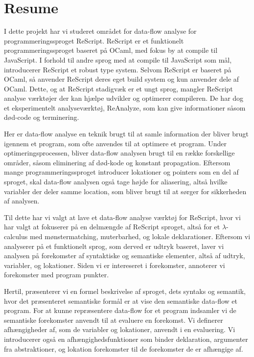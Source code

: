 \documentclass[../master.tex]{subfiles}
\begin{document}
\section*{Resume}
I dette projekt har vi studeret området for data-flow analyse for programmeringssproget ReScript.
ReScript er et funktionelt programmeringssproget baseret på OCaml, med fokus by at compile til JavaScript.
I forhold til andre sprog med at compile til JavaScript som mål, introducerer ReScript et robust type system.
Selvom ReScript er baseret på OCaml, så anvender ReScript deres eget build system og kun anvender dele af OCaml.
Dette, og at ReScript stadigvæk er et ungt sprog, mangler ReScript analyse værktøjer der kan hjælpe udvikler og optimerer compileren.
De har dog et eksperimentelt analyseværktøj, ReAnalyze, som kan give informationer såsom død-code og terminering.

Her er data-flow analyse en teknik brugt til at samle information der bliver brugt igennem et program, som ofte anvendes til at optimere et program.
Under optimeringsprocessen, bliver data-flow analysen brugt til en række forskellige områder, såsom eliminering af død-kode og konstant propagation.
Eftersom mange programmeringssproget introducer lokationer og pointers som en del af sproget, skal data-flow analysen også tage højde for aliasering, altså hvilke variabler der deler samme location, som bliver brugt til at sørger for sikkerheden af analysen.
\bigskip

Til dette har vi valgt at lave et data-flow analyse værktøj for ReScript, hvor vi har valgt at fokuserer på en delmængde af ReScript sproget, altså for et $\lambda$-calculus med mønstermatching, muterbarhed, og lokale deklarationer.
Eftersom vi analyserer på et funktionelt sprog, som derved er udtryk baseret, laver vi analysen på forekomster af syntaktiske og semantiske elementer, altså af udtryk, variabler, og lokationer.
Siden vi er intereseret i forekomster, annoterer vi forekomster med program punkter.

Hertil, præsenterer vi en formel beskrivelse af sproget, dets syntaks og semantik, hvor det præsenteret semantiske formål er at vise den semantiske data-flow et program.
For at kunne repræsentere data-flow for et program indsamler vi de semantiske forekomster anvendt til at evaluere en forekomst.
Vi definerer afhængigheder af, som de variabler og lokationer, anvendt i en evaluering.
Vi introducerer også en afhængighedsfunktioner som binder deklaration, argumenter fra abstraktioner, og lokation forekomster til de forekomster de er afhængige af.
\end{document}
